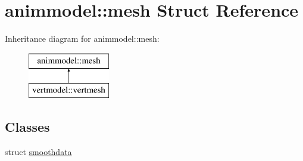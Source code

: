 \hypertarget{structanimmodel_1_1mesh}{}\section{animmodel\+:\+:mesh Struct Reference}
\label{structanimmodel_1_1mesh}
Inheritance diagram for animmodel\+:\+:mesh\+:\begin{figure}[H]
\begin{center}
\leavevmode
\includegraphics[height=2.000000cm]{structanimmodel_1_1mesh}
\end{center}
\end{figure}
\subsection*{Classes}
\begin{DoxyCompactItemize}
\item 
struct \hyperlink{structanimmodel_1_1mesh_1_1smoothdata}{smoothdata}
\end{DoxyCompactItemize}
